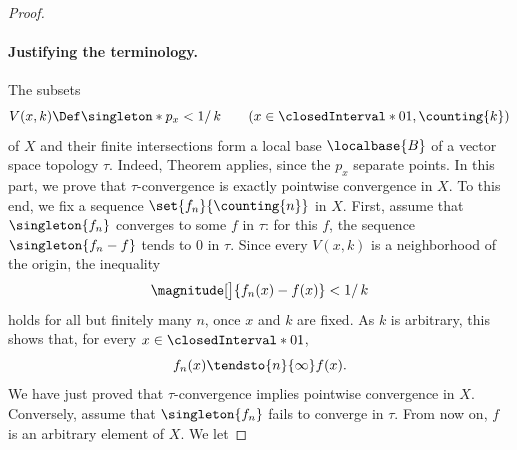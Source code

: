 \begin{proof}\leavevmode
%
\paragraph{Justifying the terminology.}
The subsets 
%
\begin{equation}
  V(x, k) \Def \singleton*{p_x < 1/\,k} \qquad (x \in \closedInterval*{0}{1}, \counting{k})
\end{equation}
%
of $X$ and their finite intersections form a local base $\localbase{B}$ of a vector space topology $\tau$. Indeed, Theorem %
 applies, since the $p_x$ separate points. In this part, we prove that $\tau$-convergence is exactly pointwise %
convergence in $X$. To this end, we fix a sequence $\set{f_n}{\counting{n}}$ in $X$. %
%
First, assume that $\singleton{f_n}$ converges to some $f$ in $\tau$: for this $f$, the sequence $\singleton{f_n - f}$ %
tends to $0$ in $\tau$. Since every $V(x, k)$ is a neighborhood of the origin, the inequality
%
\begin{equation}\label{1.7:f-n-convergence}
  \magnitude[\big]{f_n(x) - f(x)} < 1/\,k 
\end{equation}
%
holds for all but finitely many $n$, once $x$ and $k$ are fixed. As $k$ is arbitrary, this shows that, for every %
$x \in \closedInterval*{0}{1}$, 
%
\begin{equation}
  f_n(x) \tendsto{n}{\infty} f(x). 
\end{equation}
% 
We have just proved that $\tau$-convergence implies pointwise convergence in $X$. %
\skipline
Conversely, assume that $\singleton{f_n}$ fails to converge in $\tau$. From now on, $f$ is an arbitrary element of $X$. We let 

\end{proof}
